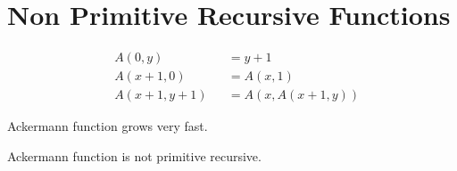 \section{Non Primitive Recursive Functions}

\begin{definition}
\begin{align*}
    & A(0,y) &&= y+1 \\
    & A(x+1,0) &&= A(x,1) \\
    & A(x+1,y+1) &&= A(x,A(x+1,y))
\end{align*}

\end{definition}

Ackermann function grows very fast.

\begin{theorem}
Ackermann function is not primitive recursive.
\end{theorem}

